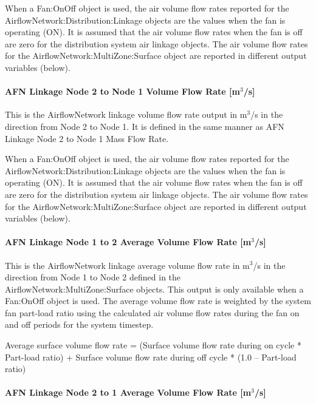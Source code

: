 When a Fan:OnOff object is used, the air volume flow rates reported for the AirflowNetwork:Distribution:Linkage objects are the values when the fan is operating (ON). It is assumed that the air volume flow rates when the fan is off are zero for the distribution system air linkage objects. The air volume flow rates for the AirflowNetwork:MultiZone:Surface object are reported in different output variables (below).

\paragraph{AFN Linkage Node 2 to Node 1 Volume Flow Rate {[}m\(^{3}\)/s{]}}\label{afn-linkage-node-2-to-node-1-volume-flow-rate-m3s}

This is the AirflowNetwork linkage volume flow rate output in m\(^{3}\)/s in the direction from Node 2 to Node 1. It is defined in the same manner as AFN Linkage Node 2 to Node 1 Mass Flow Rate.

When a Fan:OnOff object is used, the air volume flow rates reported for the AirflowNetwork:Distribution:Linkage objects are the values when the fan is operating (ON). It is assumed that the air volume flow rates when the fan is off are zero for the distribution system air linkage objects. The air volume flow rates for the AirflowNetwork:MultiZone:Surface object are reported in different output variables (below).

\paragraph{AFN Linkage Node 1 to 2 Average Volume Flow Rate {[}m\(^{3}\)/s{]}}\label{afn-linkage-node-1-to-2-average-volume-flow-rate-m3s}

This is the AirflowNetwork linkage average volume flow rate in m\(^{3}\)/s in the direction from Node 1 to Node 2 defined in the AirflowNetwork:MultiZone:Surface objects. This output is only available when a Fan:OnOff object is used. The average volume flow rate is weighted by the system fan part-load ratio using the calculated air volume flow rates during the fan on and off periods for the system timestep.

Average surface volume flow rate = (Surface volume flow rate during on cycle * Part-load ratio) + Surface volume flow rate during off cycle * (1.0 -- Part-load ratio)

\paragraph{AFN Linkage Node 2 to 1 Average Volume Flow Rate {[}m\(^{3}\)/s{]}}\label{afn-linkage-node-2-to-1-average-volume-flow-rate-m3s}

